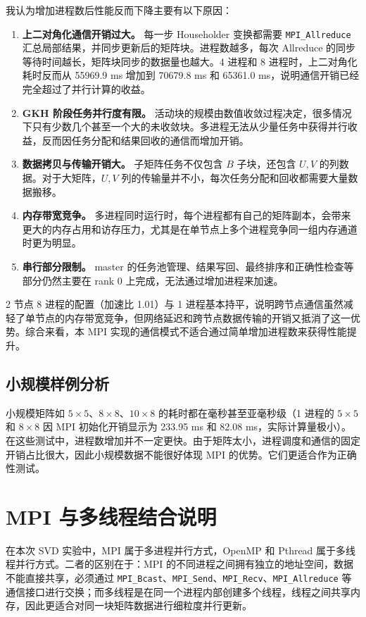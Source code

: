 \documentclass[UTF8,a4paper,12pt]{ctexart}
\begin{document}
我认为增加进程数后性能反而下降主要有以下原因：
\begin{enumerate}
  \item \textbf{上二对角化通信开销过大。} 每一步 Householder 变换都需要 \texttt{MPI\_Allreduce} 汇总局部结果，并同步更新后的矩阵块。进程数越多，每次 Allreduce 的同步等待时间越长，矩阵块同步的数据量也越大。4 进程和 8 进程时，上二对角化耗时反而从 55969.9 ms 增加到 70679.8 ms 和 65361.0 ms，说明通信开销已经完全超过了并行计算的收益。
  \item \textbf{GKH 阶段任务并行度有限。} 活动块的规模由数值收敛过程决定，很多情况下只有少数几个甚至一个大的未收敛块。多进程无法从少量任务中获得并行收益，反而因任务分配和结果回收的通信而增加开销。
  \item \textbf{数据拷贝与传输开销大。} 子矩阵任务不仅包含 $B$ 子块，还包含 $U,V$ 的列数据。对于大矩阵，$U,V$ 列的传输量并不小，每次任务分配和回收都需要大量数据搬移。
  \item \textbf{内存带宽竞争。} 多进程同时运行时，每个进程都有自己的矩阵副本，会带来更大的内存占用和访存压力，尤其是在单节点上多个进程竞争同一组内存通道时更为明显。
  \item \textbf{串行部分限制。} master 的任务池管理、结果写回、最终排序和正确性检查等部分仍然主要在 rank 0 上完成，无法通过增加进程来加速。
\end{enumerate}

2 节点 8 进程的配置（加速比 1.01）与 1 进程基本持平，说明跨节点通信虽然减轻了单节点的内存带宽竞争，但网络延迟和跨节点数据传输的开销又抵消了这一优势。综合来看，本 MPI 实现的通信模式不适合通过简单增加进程数来获得性能提升。

\subsection{小规模样例分析}

小规模矩阵如 $5\times5$、$8\times8$、$10\times8$ 的耗时都在毫秒甚至亚毫秒级（1 进程的 $5\times5$ 和 $8\times8$ 因 MPI 初始化开销显示为 233.95 ms 和 82.08 ms，实际计算量极小）。在这些测试中，进程数增加并不一定更快。由于矩阵太小，进程调度和通信的固定开销占比很大，因此小规模数据不能很好体现 MPI 的优势。它们更适合作为正确性测试。

\section{MPI 与多线程结合说明}

在本次 SVD 实验中，MPI 属于多进程并行方式，OpenMP 和 Pthread 属于多线程并行方式。二者的区别在于：MPI 的不同进程之间拥有独立的地址空间，数据不能直接共享，必须通过 \texttt{MPI\_Bcast}、\texttt{MPI\_Send}、\texttt{MPI\_Recv}、\texttt{MPI\_Allreduce} 等通信接口进行交换；而多线程是在同一个进程内部创建多个线程，线程之间共享内存，因此更适合对同一块矩阵数据进行细粒度并行更新。
\end{document}
